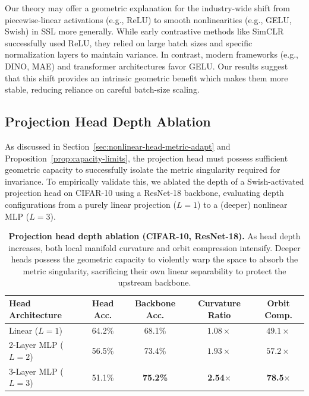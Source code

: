 \documentclass{article}
\theoremstyle{plain}
\theoremstyle{definition}
\theoremstyle{remark}
\begin{document}
Our theory may offer a geometric explanation for the industry-wide shift from piecewise-linear activations (e.g., ReLU) to smooth nonlinearities (e.g., GELU, Swish) in SSL more generally. While early contrastive methods like SimCLR successfully used ReLU, they relied on large batch sizes and specific normalization layers to maintain variance. In contrast, modern frameworks (e.g., DINO, MAE) and transformer architectures favor GELU. Our results suggest that this shift provides an intrinsic geometric benefit which makes them more stable, reducing reliance on careful batch-size scaling.

\subsection{Projection Head Depth Ablation}
\label{app:depth-ablation}

As discussed in Section~\ref{sec:nonlinear-head-metric-adapt} and Proposition~\ref{prop:capacity-limits}, the projection head must possess sufficient geometric capacity to successfully isolate the metric singularity required for invariance. To empirically validate this, we ablated the depth of a Swish-activated projection head on CIFAR-10 using a ResNet-18 backbone, evaluating depth configurations from a purely linear projection ($L=1$) to a (deeper) nonlinear MLP ($L=3$). 

\begin{table}[ht]
\centering
\scriptsize
\caption{\textbf{Projection head depth ablation (CIFAR-10, ResNet-18).} As head depth increases, both local manifold curvature and orbit compression intensify. Deeper heads possess the geometric capacity to violently warp the space to absorb the metric singularity, sacrificing their own linear separability to protect the upstream backbone.}
\label{tab:depth_ablation}
\begin{tabular}{lcccc}
\toprule
\textbf{Head Architecture} & \textbf{Head Acc.} & \textbf{Backbone Acc.} & \textbf{Curvature Ratio} & \textbf{Orbit Comp.} \\
\midrule
Linear ($L=1$)             & 64.2\%             & 68.1\%                 & $1.08\times$             & $49.1\times$ \\
2-Layer MLP ($L=2$)        & 56.5\%             & 73.4\%                 & $1.93\times$             & $57.2\times$ \\
3-Layer MLP ($L=3$)        & 51.1\%             & \textbf{75.2\%}        & \textbf{2.54$\times$}    & \textbf{78.5$\times$} \\
\bottomrule
\end{tabular}
\end{table}
\end{document}
